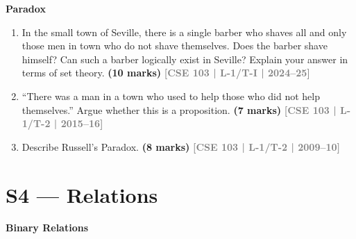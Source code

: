 \documentclass[12pt,a3paper]{article}
\newcommand{\yr}[1]{\hfill\textcolor{gray}{\small\textbf{[#1]}}}
\newcommand{\mk}[1]{\textcolor{orange!70!black}{\small\textbf{(#1 marks)}}}
\newcommand{\subtopic}[2]{%
  \vspace{10pt}
  \noindent\begin{tcolorbox}[colback=#1!8,colframe=#1,boxrule=0.6pt,arc=4pt,
    left=6pt,right=6pt,top=4pt,bottom=4pt]
    \small\bfseries\textcolor{#1}{#2}
  \end{tcolorbox}
  \vspace{2pt}
}
\begin{document}
\subtopic{cB}{Paradox}
\label{sub:s3-paradox}

\begin{enumerate}

\item In the small town of Seville, there is a single barber who shaves all and only those men in town who do not shave themselves. Does the barber shave himself? Can such a barber logically exist in Seville? Explain your answer in terms of set theory.
\mk{10} \yr{CSE 103 | L-1/T-I | 2024--25}

\item ``There was a man in a town who used to help those who did not help themselves.'' Argue whether this is a proposition.
\mk{7} \yr{CSE 103 | L-1/T-2 | 2015--16}

\item Describe Russell's Paradox.
\mk{8} \yr{CSE 103 | L-1/T-2 | 2009--10}

\end{enumerate}




\section{S4 --- Relations}
\label{sec:S4}

\subtopic{cB}{Binary Relations}
\label{sub:s4-relations}
\end{document}
